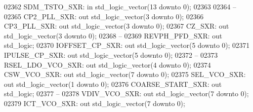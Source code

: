 \begin{DoxyCode}
02362     SDM\_TSTO\_SXR:   \textcolor{keywordflow}{in} \textcolor{comment}{std\_logic\_vector}(\textcolor{vhdllogic}{}\textcolor{vhdllogic}{13} \textcolor{keywordflow}{downto} \textcolor{vhdllogic}{}\textcolor{vhdllogic}{0});
02363 
02364 \textcolor{keyword}{    --}
02365     CP2\_PLL\_SXR:    \textcolor{keywordflow}{out} \textcolor{comment}{std\_logic\_vector}(\textcolor{vhdllogic}{}\textcolor{vhdllogic}{3} \textcolor{keywordflow}{downto} \textcolor{vhdllogic}{}\textcolor{vhdllogic}{0});
02366     CP3\_PLL\_SXR:    \textcolor{keywordflow}{out} \textcolor{comment}{std\_logic\_vector}(\textcolor{vhdllogic}{}\textcolor{vhdllogic}{3} \textcolor{keywordflow}{downto} \textcolor{vhdllogic}{}\textcolor{vhdllogic}{0});
02367     CZ\_SXR: \textcolor{keywordflow}{out} \textcolor{comment}{std\_logic\_vector}(\textcolor{vhdllogic}{}\textcolor{vhdllogic}{3} \textcolor{keywordflow}{downto} \textcolor{vhdllogic}{}\textcolor{vhdllogic}{0});
02368 \textcolor{keyword}{    --}
02369     REVPH\_PFD\_SXR:  \textcolor{keywordflow}{out} \textcolor{comment}{std\_logic};
02370     IOFFSET\_CP\_SXR: \textcolor{keywordflow}{out} \textcolor{comment}{std\_logic\_vector}(\textcolor{vhdllogic}{}\textcolor{vhdllogic}{5} \textcolor{keywordflow}{downto} \textcolor{vhdllogic}{}\textcolor{vhdllogic}{0});
02371     IPULSE\_CP\_SXR:  \textcolor{keywordflow}{out} \textcolor{comment}{std\_logic\_vector}(\textcolor{vhdllogic}{}\textcolor{vhdllogic}{5} \textcolor{keywordflow}{downto} \textcolor{vhdllogic}{}\textcolor{vhdllogic}{0});
02372 \textcolor{keyword}{    --}
02373     RSEL\_LDO\_VCO\_SXR:   \textcolor{keywordflow}{out} \textcolor{comment}{std\_logic\_vector}(\textcolor{vhdllogic}{}\textcolor{vhdllogic}{4} \textcolor{keywordflow}{downto} \textcolor{vhdllogic}{}\textcolor{vhdllogic}{0});
02374     CSW\_VCO\_SXR:    \textcolor{keywordflow}{out} \textcolor{comment}{std\_logic\_vector}(\textcolor{vhdllogic}{}\textcolor{vhdllogic}{7} \textcolor{keywordflow}{downto} \textcolor{vhdllogic}{}\textcolor{vhdllogic}{0});
02375     SEL\_VCO\_SXR:    \textcolor{keywordflow}{out} \textcolor{comment}{std\_logic\_vector}(\textcolor{vhdllogic}{}\textcolor{vhdllogic}{1} \textcolor{keywordflow}{downto} \textcolor{vhdllogic}{}\textcolor{vhdllogic}{0});
02376     COARSE\_START\_SXR:   \textcolor{keywordflow}{out} \textcolor{comment}{std\_logic};
02377 \textcolor{keyword}{    --}
02378     VDIV\_VCO\_SXR:   \textcolor{keywordflow}{out} \textcolor{comment}{std\_logic\_vector}(\textcolor{vhdllogic}{}\textcolor{vhdllogic}{7} \textcolor{keywordflow}{downto} \textcolor{vhdllogic}{}\textcolor{vhdllogic}{0});
02379     ICT\_VCO\_SXR:    \textcolor{keywordflow}{out} \textcolor{comment}{std\_logic\_vector}(\textcolor{vhdllogic}{}\textcolor{vhdllogic}{7} \textcolor{keywordflow}{downto} \textcolor{vhdllogic}{}\textcolor{vhdllogic}{0});

\end{DoxyCode}
